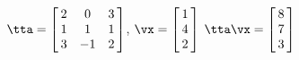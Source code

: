 {$\tta =   \left[\hskip -3pt \begin{array}{ccc} 2&0&3\\  1&1&1
\\  3&-1&2\end{array}\hskip -3pt \right]  $,\quad  
$\vx = \left[\hskip -3pt \begin{array}{c} 1\\  4\\  2
\end{array}\hskip -3pt \right]$}
{$\tta\vx= \left[\hskip -3pt \begin{array}{c} 8\\  7\\  3
\end{array}\hskip -3pt \right]$
}
 
